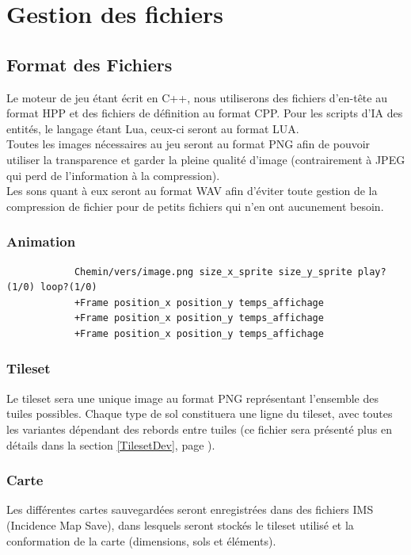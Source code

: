 \documentclass[a4paper]{article}
\newcommand{\alinea}{\hspace*{0.5cm}}
\begin{document}
    \section{Gestion des fichiers}
      \subsection{Format des Fichiers}
	    \alinea Le moteur de jeu étant écrit en C++, nous utiliserons des fichiers d'en-tête au format HPP et des fichiers de définition au format CPP. Pour les scripts d'IA des entités, le langage étant Lua, ceux-ci seront au format LUA.\\
        \alinea Toutes les images nécessaires au jeu seront au format PNG afin de pouvoir utiliser la transparence et garder la pleine qualité d'image (contrairement à JPEG qui perd de l'information à la compression).\\
        \alinea Les sons quant à eux seront au format WAV afin d'éviter toute gestion de la compression de fichier pour de petits fichiers qui n'en ont aucunement besoin.

        \subsubsection{Animation}
          \begin{verbatim}
            Chemin/vers/image.png size_x_sprite size_y_sprite play?(1/0) loop?(1/0)
            +Frame position_x position_y temps_affichage
            +Frame position_x position_y temps_affichage
            +Frame position_x position_y temps_affichage
          \end{verbatim}
      
        \subsubsection{Tileset}
	      \alinea Le tileset sera une unique image au format PNG représentant l'ensemble des tuiles possibles. Chaque type de sol constituera une ligne du tileset, avec toutes les variantes dépendant des rebords entre tuiles (ce fichier sera présenté plus en détails dans la section \ref{TilesetDev}, page \pageref{TilesetDev}).

        \subsubsection{Carte}
	      \alinea Les différentes cartes sauvegardées seront enregistrées dans des fichiers IMS (Incidence Map Save), dans lesquels seront stockés le tileset utilisé et la conformation de la carte (dimensions, sols et éléments).
      
\end{document}
